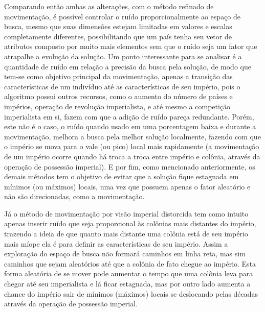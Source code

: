 Comparando então ambas as alterações, com o método refinado de movimentação, é possível controlar o ruído proporcionalmente ao espaço de busca, mesmo que suas dimensões estejam limitadas em valores e escalas completamente diferentes, possibilitando que um país tenha seu vetor de atributos composto por muito mais elementos sem que o ruído seja um fator que atrapalhe a evolução da solução. Um ponto interessante para se analisar é a quantidade de ruído em relação a precisão da busca pela solução, de modo que tem-se como objetivo principal da movimentação, apenas a transição das características de um indivíduo até as características de seu império, pois o algoritmo possui outros recursos, como o aumento do número de países e impérios, operação de revolução imperialista, e até mesmo a competição imperialista em si, fazem com que a adição de ruído pareça redundante. Porém, este não é o caso, o ruído quando usado em uma porcentagem baixa e durante a movimentação, melhora a busca pela melhor solução localmente, fazendo com que o império se mova para o vale (ou pico) local mais rapidamente (a movimentação de um império ocorre quando há troca a troca entre império e colônia, através da operação de possessão imperial). E por fim, como mencionado anteriormente, os demais métodos tem o objetivo de evitar que a solução fique estagnada em mínimos (ou máximos) locais, uma vez que possuem apenas o fator aleatório e não são direcionadas, como a movimentação. 

Já o método de movimentação por visão imperial distorcida tem como intuito apenas inserir ruído que seja proporcional às colônias mais distantes do império, trazendo a ideia de que quanto mais distante uma colônia está de seu império mais míope ela é para definir as características de seu império. Assim a exploração do espaço de busca não formará caminhos em linha reta, mas sim caminhos que sejam aleatórios até que a colônia de fato chegue ao império. Esta forma aleatória de se mover pode aumentar o tempo que uma colônia leva para chegar até seu imperialista e lá ficar estagnada, mas por outro lado aumenta a chance do império sair de mínimos (máximos) locais se deslocando pelas décadas através da operação de possessão imperial.

